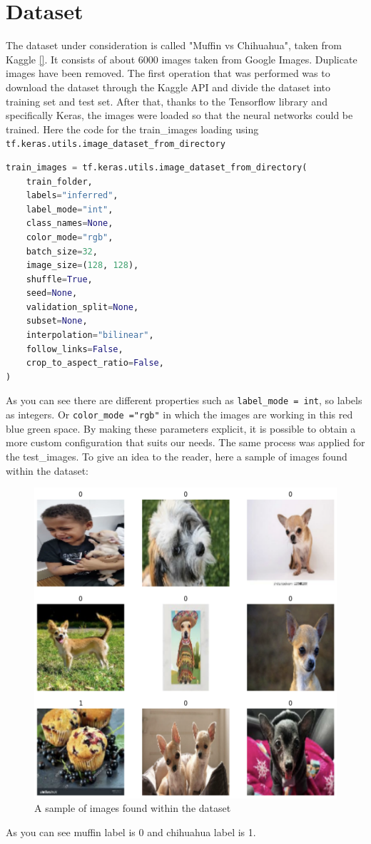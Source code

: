 \chapter{Dataset} \label{ch:dataset}
The dataset under consideration is called "Muffin vs Chihuahua", taken from Kaggle \ref{}.
It consists of about 6000 images taken from Google Images. Duplicate images have been removed.
The first operation that was performed was to download the dataset through the Kaggle API and divide the dataset into training set and test set. After that, thanks to the Tensorflow library and specifically Keras, the images were loaded so that the neural networks could be trained. Here the code for the train\_images loading using \texttt{tf.keras.utils.image\_dataset\_from\_directory}
\begin{lstlisting}[language=Python]
train_images = tf.keras.utils.image_dataset_from_directory(
    train_folder,
    labels="inferred",
    label_mode="int",
    class_names=None,
    color_mode="rgb",
    batch_size=32,
    image_size=(128, 128),
    shuffle=True,
    seed=None,
    validation_split=None,
    subset=None,
    interpolation="bilinear",
    follow_links=False,
    crop_to_aspect_ratio=False,
)
\end{lstlisting}
As you can see there are different properties such as \texttt{label\_mode = int}, so labels as integers. Or \texttt{color\_mode ="rgb"} in which the images are working in this red blue green space. By making these parameters explicit, it is possible to obtain a more custom configuration that suits our needs. The same process was applied for the test\_images.
To give an idea to the reader, here a sample of images found within the dataset:
\begin{figure}[hbtp]
\caption{A sample of images found within the dataset}
\centering
\includegraphics[scale=0.5]{../Images/sampleimages.png}
\end{figure}
As you can see muffin label is 0 and chihuahua label is 1.
